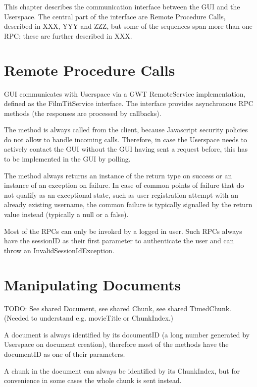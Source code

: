 \label{chap:communication}
\label{sec:communication}

This chapter describes the communication interface between the GUI and the Userspace. The central part of the interface are Remote Procedure Calls, described in XXX, YYY and ZZZ, but some of the sequences span more than one RPC: these are further described in XXX.

\section{Remote Procedure Calls}

GUI communicates with Userspace via a GWT RemoteService implementation, defined as the FilmTitService interface.
The interface provides asynchronous RPC methods (the responses are processed by callbacks).

The method is always called from the client, because Javascript security policies do not allow to handle incoming calls.
Therefore, in case the Userspace needs to actively contact the GUI without the GUI having sent a request before,
this has to be implemented in the GUI by polling.

The method always returns an instance of the return type on success or an instance of an exception on failure.
In case of common points of failure that do not qualify as an exceptional state, such as user registration attempt with an already existing username, the common failure is typically signalled by the return value instead (typically a null or a false).

Most of the RPCs can only be invoked by a logged in user. Such RPCs always have the sessionID as their first parameter to authenticate the user and can throw an InvalidSessionIdException.

\section{Manipulating Documents}

TODO: See shared Document, see shared Chunk, see shared TimedChunk.
(Needed to understand e.g. movieTitle or ChunkIndex.)

A document is always identified by its documentID (a long number generated by Userspace on document creation), therefore most of the methods have the documentID as one of their parameters.

A chunk in the document can always be identified by its ChunkIndex, but for convenience in some cases the whole chunk is sent instead.

